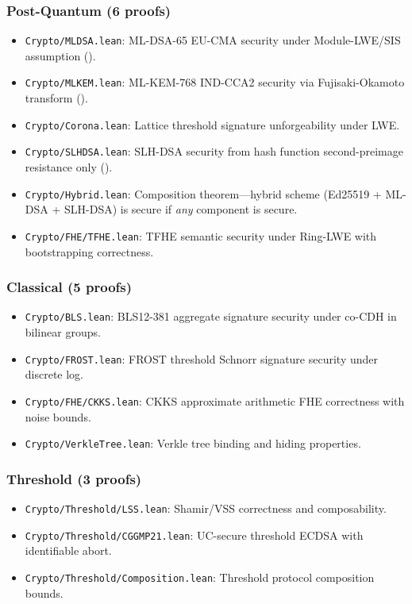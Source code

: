\documentclass[11pt,letterpaper]{article}
\begin{document}
\subsubsection{Post-Quantum (6 proofs)}

\begin{itemize}
\item \texttt{Crypto/MLDSA.lean}: ML-DSA-65 EU-CMA security under Module-LWE/SIS assumption ().
\item \texttt{Crypto/MLKEM.lean}: ML-KEM-768 IND-CCA2 security via Fujisaki-Okamoto transform ().
\item \texttt{Crypto/Corona.lean}: Lattice threshold signature unforgeability under LWE.
\item \texttt{Crypto/SLHDSA.lean}: SLH-DSA security from hash function second-preimage resistance only ().
\item \texttt{Crypto/Hybrid.lean}: Composition theorem---hybrid scheme (Ed25519 + ML-DSA + SLH-DSA) is secure if \emph{any} component is secure.
\item \texttt{Crypto/FHE/TFHE.lean}: TFHE semantic security under Ring-LWE with bootstrapping correctness.
\end{itemize}

\subsubsection{Classical (5 proofs)}

\begin{itemize}
\item \texttt{Crypto/BLS.lean}: BLS12-381 aggregate signature security under co-CDH in bilinear groups.
\item \texttt{Crypto/FROST.lean}: FROST threshold Schnorr signature security under discrete log.
\item \texttt{Crypto/FHE/CKKS.lean}: CKKS approximate arithmetic FHE correctness with noise bounds.
\item \texttt{Crypto/VerkleTree.lean}: Verkle tree binding and hiding properties.
\end{itemize}

\subsubsection{Threshold (3 proofs)}

\begin{itemize}
\item \texttt{Crypto/Threshold/LSS.lean}: Shamir/VSS correctness and composability.
\item \texttt{Crypto/Threshold/CGGMP21.lean}: UC-secure threshold ECDSA with identifiable abort.
\item \texttt{Crypto/Threshold/Composition.lean}: Threshold protocol composition bounds.
\end{itemize}
\end{document}
